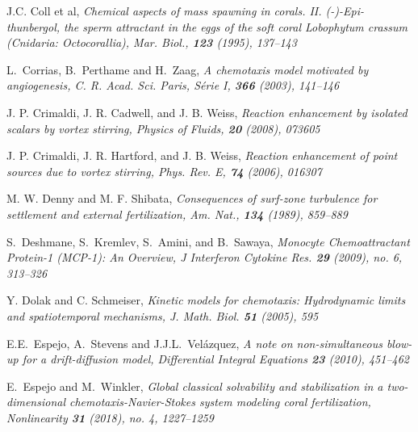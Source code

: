 \documentclass[12pt,reqno]{amsart}
\begin{document}
\begin{thebibliography}{[MT]}
 J.C. Coll et al, \it Chemical aspects of mass spawning in corals. II. (-)-Epi-thunbergol, the sperm attractant in the eggs of the soft coral Lobophytum crassum (Cnidaria: Octocorallia), \rm
Mar. Biol., {\bf 123} (1995), 137--143

 L.~Corrias, B.~Perthame and H.~Zaag, \it A chemotaxis model motivated by angiogenesis, \rm C. R. Acad. Sci. Paris, Série I, {\bf 366} (2003), 141--146

 J. P. Crimaldi, J. R. Cadwell, and J. B. Weiss, \it Reaction enhancement by isolated scalars by vortex stirring, \rm Physics of Fluids, {\bf 20} (2008), 073605

 J. P. Crimaldi, J. R. Hartford, and J. B. Weiss, \it  Reaction enhancement of point sources due to vortex stirring, \rm Phys. Rev. E, {\bf 74} (2006), 016307


 M. W. Denny and M. F. Shibata, \it Consequences of surf-zone turbulence for settlement and external fertilization, \rm Am. Nat., {\bf 134} (1989), 859--889

S.~Deshmane, S.~Kremlev, S.~Amini, and B.~Sawaya, \it  Monocyte Chemoattractant Protein-1 (MCP-1): An Overview,
\rm J Interferon Cytokine Res. {\bf 29} (2009), no. 6, 313--326

 Y. Dolak and C. Schmeiser, \it Kinetic models for chemotaxis: Hydrodynamic limits and spatiotemporal
mechanisms, \rm J. Math. Biol. {\bf 51} (2005), 595



 E.E.~Espejo, A.~Stevens and J.J.L.~Vel\'azquez, \it
 A note on non-simultaneous blow-up for a drift-diffusion model, \rm Differential Integral Equations {\bf 23} (2010), 451--462

 E.~Espejo and M.~Winkler, \it
Global classical solvability and stabilization in a two-dimensional chemotaxis-Navier-Stokes system modeling coral fertilization, \rm
Nonlinearity {\bf 31} (2018), no. 4, 1227--1259


\end{thebibliography}
\end{document}
